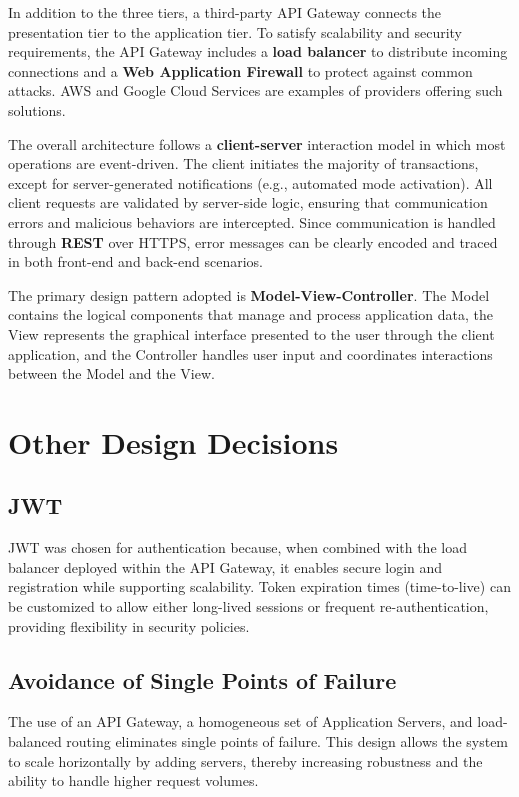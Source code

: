 In addition to the three tiers, a third-party API Gateway connects the presentation tier to the application tier. To satisfy scalability and security requirements, the API Gateway includes a \textbf{load balancer} to distribute incoming connections and a \textbf{Web Application Firewall} to protect against common attacks. AWS and Google Cloud Services are examples of providers offering such solutions.

The overall architecture follows a \textbf{client-server} interaction model in which most operations are event-driven. The client initiates the majority of transactions, except for server-generated notifications (e.g., automated mode activation). All client requests are validated by server-side logic, ensuring that communication errors and malicious behaviors are intercepted. Since communication is handled through \textbf{REST} over HTTPS, error messages can be clearly encoded and traced in both front-end and back-end scenarios.

The primary design pattern adopted is \textbf{Model-View-Controller}. The Model contains the logical components that manage and process application data, the View represents the graphical interface presented to the user through the client application, and the Controller handles user input and coordinates interactions between the Model and the View.

\section{Other Design Decisions}

\subsection{JWT}
JWT was chosen for authentication because, when combined with the load balancer deployed within the API Gateway, it enables secure login and registration while supporting scalability. Token expiration times (time-to-live) can be customized to allow either long-lived sessions or frequent re-authentication, providing flexibility in security policies.

\subsection{Avoidance of Single Points of Failure}
The use of an API Gateway, a homogeneous set of Application Servers, and load-balanced routing eliminates single points of failure. This design allows the system to scale horizontally by adding servers, thereby increasing robustness and the ability to handle higher request volumes.

